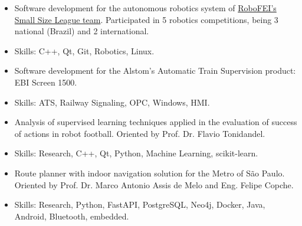 \documentclass[10pt,a4paper,ragged2e,withhyper]{altacv}
\begin{document}
\begin{paracol}{2}

\begin{itemize}
\item Software development for the autonomous robotics system of \href{https://gitlab.com/robofei/ssl}{RoboFEI's Small Size League team}. Participated in 5 robotics competitions, being 3 national (Brazil) and 2 international. 
\item Skills: C++, Qt, Git, Robotics, Linux.
\end{itemize}

\divider

\begin{itemize}
\item Software development for the Alstom's Automatic Train Supervision product: EBI Screen 1500.
\item Skills: ATS, Railway Signaling, OPC, Windows, HMI.
\end{itemize}


\begin{itemize}
\item Analysis of supervised learning techniques applied in the evaluation of success of actions in robot football. Oriented by Prof. Dr. Flavio Tonidandel.
\item Skills: Research, C++, Qt, Python, Machine Learning, scikit-learn.
\end{itemize}

\divider

\begin{itemize}
  \item Route planner with indoor navigation solution for the Metro of São Paulo. Oriented by Prof. Dr. Marco Antonio Assis de Melo and Eng. Felipe Copche.
  \item Skills: Research, Python, FastAPI, PostgreSQL, Neo4j, Docker, Java, Android, Bluetooth, embedded.
\end{itemize}
  

\end{paracol}
\end{document}
